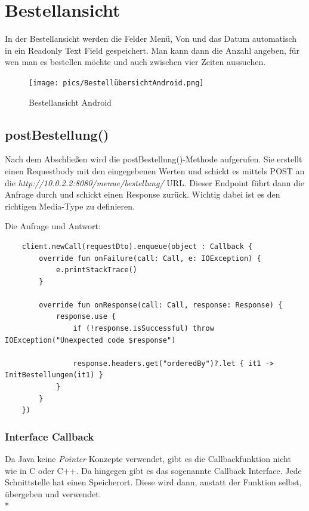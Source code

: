 \section{Bestellansicht}

In der Bestellansicht werden die Felder Menü, Von und das Datum automatisch in ein Readonly Text Field gespeichert.
Man kann dann die Anzahl angeben, für wen man es bestellen möchte und auch zwischen vier Zeiten aussuchen. 

\begin{figure}[htp]
    \centering
    \author{Bozidar Spasenovic}
    \texttt{[image: pics/BestellübersichtAndroid.png]}
    \caption{Bestellansicht Android}
    \label{fig:impl:BestellübersichtAndroid}
\end{figure}

\subsection{postBestellung()}
Nach dem Abschließen wird die postBestellung()-Methode aufgerufen. Sie erstellt einen Requestbody mit den eingegebenen Werten
und schickt es mittels POST an die \textit{http://10.0.2.2:8080/menue/bestellung/} URL. Dieser Endpoint führt dann die Anfrage durch und schickt einen Response zurück.
Wichtig dabei ist es den richtigen Media-Type zu definieren. 

Die Anfrage und Antwort:
\begin{lstlisting}
    client.newCall(requestDto).enqueue(object : Callback {
        override fun onFailure(call: Call, e: IOException) {
            e.printStackTrace()
        }

        override fun onResponse(call: Call, response: Response) {
            response.use {
                if (!response.isSuccessful) throw IOException("Unexpected code $response")

                response.headers.get("orderedBy")?.let { it1 -> InitBestellungen(it1) }
            }
        }
    })
\end{lstlisting}


\subsubsection{Interface Callback}
\cite{Callback}
Da Java keine \textit{Pointer} Konzepte verwendet, gibt es die Callbackfunktion nicht wie in C oder C++.
Da hingegen gibt es das sogenannte Callback Interface.
Jede Schnittstelle hat einen Speicherort. Diese wird dann, anstatt der Funktion selbst, übergeben und verwendet.
\\*

